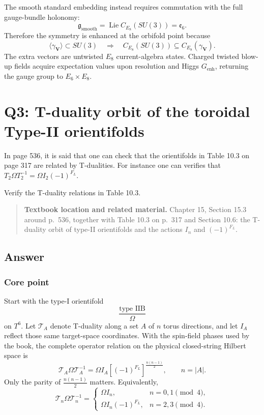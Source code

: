 \documentclass[
  10pt,
  a4paper,
  openany]{book}
\begin{document}
The smooth standard embedding instead requires commutation with the full
gauge-bundle holonomy: \[
\boxed{
\mathfrak g_{\mathrm{smooth}}
=
\operatorname{Lie}C_{E_8}(SU(3))
=
\mathfrak e_6
}.
\] Therefore the symmetry is enhanced at the orbifold point because \[
\boxed{
\langle\gamma_{\mathbf V}\rangle
\subset SU(3)
\quad\Longrightarrow\quad
C_{E_8}(SU(3))
\subseteq
C_{E_8}(\gamma_{\mathbf V})
}.
\] The extra vectors are untwisted \(E_8\) current-algebra states.
Charged twisted blow-up fields acquire expectation values upon
resolution and Higgs \(G_{\mathrm{enh}}\), returning the gauge group to
\(E_6\times E_8\).

\section{Q3: T-duality orbit of the toroidal Type-II
orientifolds}\label{q3-t-duality-orbit-of-the-toroidal-type-ii-orientifolds}

In page 536, it is said that one can check that the orientifolds in
Table 10.3 on page 317 are related by T-dualities. For instance one can
verifies that \(T_{2}\Omega T_{2}^{-1}=\Omega I_{2}(-1)^{F_{L}}\).

Verify the T-duality relations in Table 10.3.

\begin{quote}
\textbf{Textbook location and related material.} Chapter 15, Section
15.3 around p.~536, together with Table 10.3 on p.~317 and Section 10.6:
the T-duality orbit of type-II orientifolds and the actions \(I_n\) and
\((-1)^{F_L}\).
\end{quote}

\subsection{Answer}\label{answer-23}

\subsubsection{Core point}\label{core-point-23}

Start with the type-I orientifold \[
\frac{\text{type IIB}}{\Omega}
\] on \(T^6\). Let \(\mathcal T_A\) denote T-duality along a set \(A\)
of \(n\) torus directions, and let \(I_A\) reflect those same
target-space coordinates. With the spin-field phases used by the book,
the complete operator relation on the physical closed-string Hilbert
space is \[
\boxed{
\mathcal T_A\Omega\mathcal T_A^{-1}
=
\Omega I_A
\left[(-1)^{F_L}\right]^{\frac{n(n-1)}2}
},
\qquad n=|A|.
\] Only the parity of \(\frac{n(n-1)}2\) matters. Equivalently, \[
\mathcal T_n\Omega\mathcal T_n^{-1}
=
\begin{cases}
\Omega I_n,
&
n=0,1\pmod4,\\
\Omega I_n(-1)^{F_L},
&
n=2,3\pmod4.
\end{cases}
\]
\end{document}
